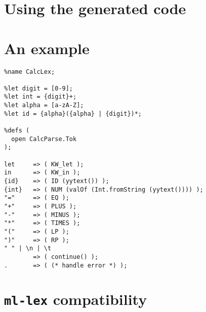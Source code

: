 \section{Using the generated code}

\section{An example}

\begin{verbatim}
%name CalcLex;

%let digit = [0-9];
%let int = {digit}+;
%let alpha = [a-zA-Z];
%let id = {alpha}({alpha} | {digit})*;

%defs (
  open CalcParse.Tok
);

let     => ( KW_let );
in      => ( KW_in );
{id}    => ( ID (yytext()) );
{int}   => ( NUM (valOf (Int.fromString (yytext()))) );
"="     => ( EQ );
"+"     => ( PLUS );
"-"     => ( MINUS );
"*"     => ( TIMES );
"("     => ( LP );
")"     => ( RP );
" " | \n | \t
        => ( continue() );
.       => ( (* handle error *) );
\end{verbatim}

\section{{\tt ml-lex} compatibility}\label{sec:lex-compat}
